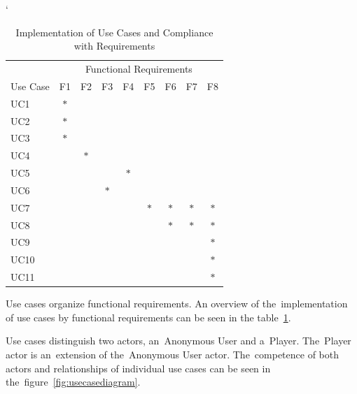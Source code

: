 \begin{table}[b]
    \catcode`
    \centering
    \begin{tabular}{lcccccccc}
    \toprule
    & \multicolumn{8}{c}{Functional Requirements} \\
    \cmidrule(l){2-9}
    Use Case & F1 & F2 & F3 & F4 & F5 & F6 & F7 & F8  \\
    \midrule
                         UC1  & $\ast$ &        &        &        &        &        &        &         \\
    \rowcolor[gray]{.95} UC2  & $\ast$ &        &        &        &        &        &        &         \\
                         UC3  & $\ast$ &        &        &        &        &        &        &         \\
    \rowcolor[gray]{.95} UC4  &        & $\ast$ &        &        &        &        &        &         \\
                         UC5  &        &        &        & $\ast$ &        &        &        &         \\
    \rowcolor[gray]{.95} UC6  &        &        & $\ast$ &        &        &        &        &         \\
                         UC7  &        &        &        &        & $\ast$ & $\ast$ & $\ast$ & $\ast$  \\
    \rowcolor[gray]{.95} UC8  &        &        &        &        &        & $\ast$ & $\ast$ & $\ast$  \\
                         UC9  &        &        &        &        &        &        &        & $\ast$  \\
    \rowcolor[gray]{.95} UC10 &        &        &        &        &        &        &        & $\ast$  \\
                         UC11 &        &        &        &        &        &        &        & $\ast$  \\
    \bottomrule
    \end{tabular}
    \caption{Implementation of Use Cases and Compliance with Requirements}
    \label{table:usecases-requirements}
\end{table}

Use cases organize functional requirements. 
An overview of the~implementation of use cases by functional requirements can be seen in the table~\ref{table:usecases-requirements}.

Use cases distinguish two actors, an~Anonymous User and a~Player.
\linebreak
The~Player actor is an~extension of the~Anonymous User actor.
The~competence of both actors and relationships of individual use cases can be seen in the~figure~\ref{fig:usecasediagram}.

